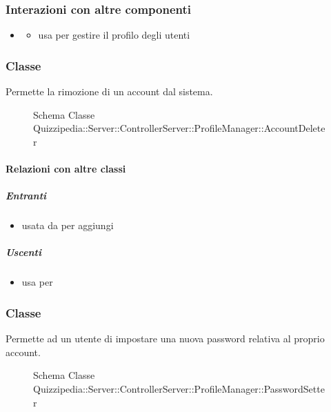 \subsubsection{Interazioni con altre componenti}
\begin{itemize}
\item {}
\begin{itemize}
\item usa  per gestire il profilo degli utenti
\end{itemize}
\end{itemize}
\subsubsection{Classe }
Permette la rimozione di un account dal sistema.
\begin{figure}[H]
\centering
\noindent{}
\caption[Schema Classe AccountDeleter]{Schema Classe Quizzipedia::Server::ControllerServer::ProfileManager::AccountDeleter}
\end{figure}
\paragraph{Relazioni con altre classi}
\subparagraph{Entranti}
\begin{itemize}
\item usata da  per aggiungi
\end{itemize}
\subparagraph{Uscenti}
\begin{itemize}
\item usa  per 
\end{itemize}
\subsubsection{Classe }
Permette ad un utente di impostare una nuova password relativa al proprio account.
\begin{figure}[H]
\centering
\noindent{}
\caption[Schema Classe PasswordSetter]{Schema Classe Quizzipedia::Server::ControllerServer::ProfileManager::PasswordSetter}
\end{figure}
